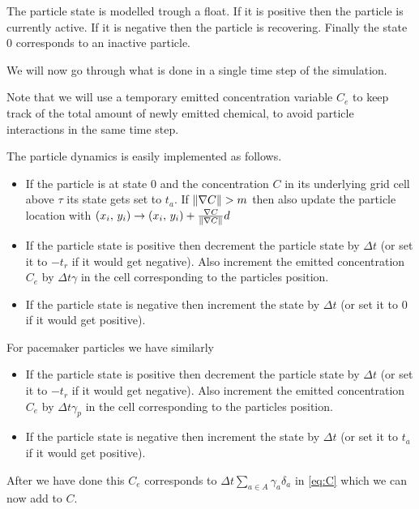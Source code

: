 \documentclass{class}
\begin{document}
The particle state is modelled trough a float.
If it is positive then the particle is currently active.
If it is negative then the particle is recovering.
Finally the state $0$ corresponds to an inactive particle.

We will now go through what is done in a single time step of the simulation.

Note that we will use a temporary emitted concentration variable $C_e$ to keep track of the total amount of newly emitted chemical, to avoid particle interactions in the same time step.

The particle dynamics is easily implemented as follows.
\begin{itemize}
    \item If the particle is at state $0$ and the concentration $C$ in its underlying grid cell above $\tau$ its state gets set to $t_a$.
    If $\norm{\nabla C}>m$ then also update the particle location with $(x_i,\,y_i)\rightarrow(x_i,\,y_i)+\frac{\nabla C}{\norm{\nabla C}}d$
    \item If the particle state is positive then decrement the particle state by $\Delta t$ (or set it to $-t_r$ if it would get negative).
    Also increment the emitted concentration $C_e$ by $\Delta t\gamma$ in the cell corresponding to the particles position.
    \item If the particle state is negative then increment the state by $\Delta t$ (or set it to $0$ if it would get positive).
\end{itemize}

For pacemaker particles we have similarly
\begin{itemize}
    \item If the particle state is positive then decrement the particle state by $\Delta t$ (or set it to $-t_r$ if it would get negative).
    Also increment the emitted concentration $C_e$ by $\Delta t\gamma_p$ in the cell corresponding to the particles position.
    \item If the particle state is negative then increment the state by $\Delta t$ (or set it to $t_a$ if it would get positive).
\end{itemize}

After we have done this $C_e$ corresponds to $\Delta t\sum_{a\in A}\gamma_a\delta_a$ in \autoref{eq:C} which we can now add to $C$.
\end{document}
